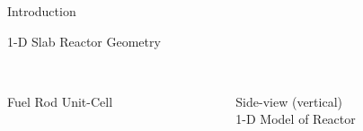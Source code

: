 \documentclass{beamer}
\begin{document}
\begin{section}{Introduction}
\begin{frame}{1-D Slab Reactor Geometry}
\begin{columns}
\begin{column}{0.5\textwidth}
\begin{center}
    \\ Fuel Rod Unit-Cell
  \end{center}
  \end{column}
  \begin{column}{0.5\textwidth}
  \begin{center}
    \scalebox{0.45}{}
      \\ Side-view (vertical)
      \\ 1-D Model of Reactor
  \end{center}
  \end{column}
\end{columns}
\end{frame}
\end{section}
\end{document}
